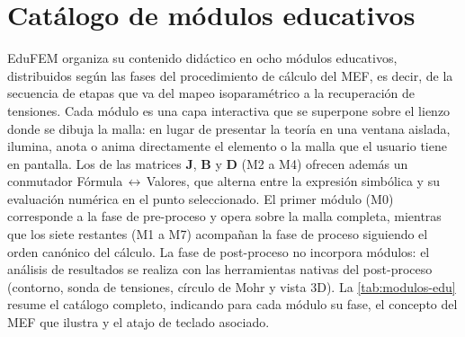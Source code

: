 \section{Catálogo de módulos educativos}
\label{sec:catalogo-modulos-edu}

EduFEM organiza su contenido didáctico en ocho módulos educativos, distribuidos según las fases del procedimiento de cálculo del MEF, es decir, de la secuencia de etapas que va del mapeo isoparamétrico a la recuperación de tensiones. Cada módulo es una capa interactiva que se superpone sobre el lienzo donde se dibuja la malla: en lugar de presentar la teoría en una ventana aislada, ilumina, anota o anima directamente el elemento o la malla que el usuario tiene en pantalla. Los de las matrices $\bm{J}$, $\bm{B}$ y $\bm{D}$ (M2 a M4) ofrecen además un conmutador Fórmula\,$\leftrightarrow$\,Valores, que alterna entre la expresión simbólica y su evaluación numérica en el punto seleccionado. El primer módulo (M0) corresponde a la fase de pre-proceso y opera sobre la malla completa, mientras que los siete restantes (M1 a M7) acompañan la fase de proceso siguiendo el orden canónico del cálculo. La fase de post-proceso no incorpora módulos: el análisis de resultados se realiza con las herramientas nativas del post-proceso (contorno, sonda de tensiones, círculo de Mohr y vista 3D). La \autoref{tab:modulos-edu} resume el catálogo completo, indicando para cada módulo su fase, el concepto del MEF que ilustra y el atajo de teclado asociado.

